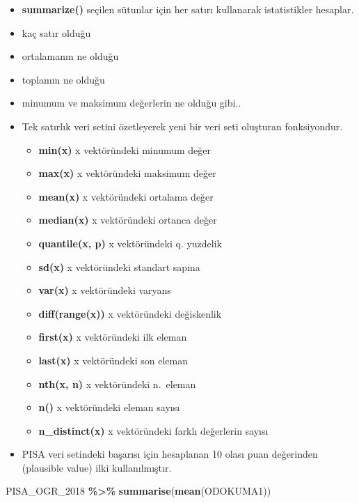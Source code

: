 \documentclass[
  oneside]{book}
\newenvironment{Shaded}{\begin{snugshade}}{\end{snugshade}}
\newcommand{\FunctionTok}[1]{\textcolor[rgb]{0.13,0.29,0.53}{\textbf{#1}}}
\newcommand{\NormalTok}[1]{#1}
\newcommand{\SpecialCharTok}[1]{\textcolor[rgb]{0.81,0.36,0.00}{\textbf{#1}}}
\providecommand{\tightlist}{%
  \setlength{\itemsep}{0pt}\setlength{\parskip}{0pt}}
\begin{document}
\begin{itemize}
\item
  \textbf{summarize()} seçilen sütunlar için her satırı kullanarak istatistikler hesaplar.
\item
  kaç satır olduğu
\item
  ortalamanın ne olduğu
\item
  toplamın ne olduğu
\item
  minumum ve maksimum değerlerin ne olduğu gibi..
\item
  Tek satırlık veri setini özetleyerek yeni bir veri seti oluşturan fonksiyondur.

  \begin{itemize}
  \tightlist
  \item
    \textbf{min(x)} x vektöründeki minumum değer
  \item
    \textbf{max(x)} x vektöründeki maksimum değer
  \item
    \textbf{mean(x)} x vektöründeki ortalama değer
  \item
    \textbf{median(x)} x vektöründeki ortanca değer
  \item
    \textbf{quantile(x, p)} x vektöründeki q. yuzdelik
  \item
    \textbf{sd(x)} x vektöründeki standart sapma
  \item
    \textbf{var(x)} x vektöründeki varyans
  \item
    \textbf{diff(range(x))} x vektöründeki değiskenlik
  \item
    \textbf{first(x)} x vektöründeki ilk eleman
  \item
    \textbf{last(x)} x vektöründeki son eleman
  \item
    \textbf{nth(x, n)} x vektöründeki n.~eleman
  \item
    \textbf{n()} x vektöründeki eleman sayısı
  \item
    \textbf{n\_distinct(x)} x vektöründeki farklı değerlerin sayısı
  \end{itemize}
\item
  PISA veri setindeki başarısı için hesaplanan 10 olası puan değerinden (plausible value) ilki kullanılmıştır.
\end{itemize}

\begin{Shaded}
\begin{Highlighting}[]
\NormalTok{PISA\_OGR\_2018 }\SpecialCharTok{\%\textgreater{}\%} 
\FunctionTok{summarise}\NormalTok{(}\FunctionTok{mean}\NormalTok{(ODOKUMA1))}
\end{Highlighting}
\end{Shaded}
\end{document}
